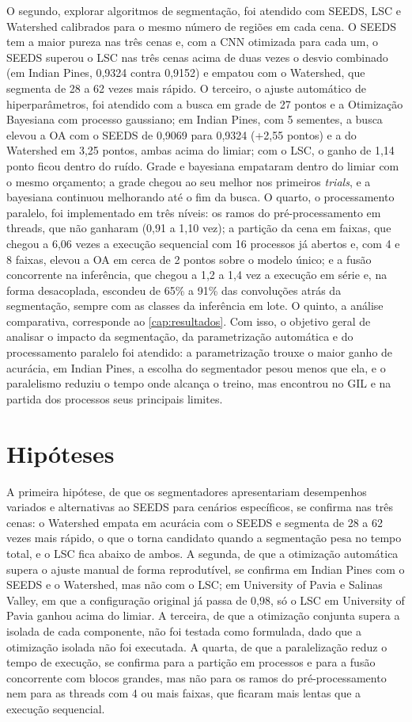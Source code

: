 O segundo, explorar algoritmos de segmentação, foi atendido com SEEDS, LSC e Watershed calibrados para o mesmo número de regiões em cada cena. O SEEDS tem a maior pureza nas três cenas e, com a CNN otimizada para cada um, o SEEDS superou o LSC nas três cenas acima de duas vezes o desvio combinado (em Indian Pines, 0,9324 contra 0,9152) e empatou com o Watershed, que segmenta de 28 a 62 vezes mais rápido. O terceiro, o ajuste automático de hiperparâmetros, foi atendido com a busca em grade de 27 pontos e a Otimização Bayesiana com processo gaussiano; em Indian Pines, com 5 sementes, a busca elevou a OA com o SEEDS de 0,9069 para 0,9324 (+2,55 pontos) e a do Watershed em 3,25 pontos, ambas acima do limiar; com o LSC, o ganho de 1,14 ponto ficou dentro do ruído. Grade e bayesiana empataram dentro do limiar com o mesmo orçamento; a grade chegou ao seu melhor nos primeiros \textit{trials}, e a bayesiana continuou melhorando até o fim da busca. O quarto, o processamento paralelo, foi implementado em três níveis: os ramos do pré-processamento em threads, que não ganharam (0,91 a 1,10 vez); a partição da cena em faixas, que chegou a 6,06 vezes a execução sequencial com 16 processos já abertos e, com 4 e 8 faixas, elevou a OA em cerca de 2 pontos sobre o modelo único; e a fusão concorrente na inferência, que chegou a 1,2 a 1,4 vez a execução em série e, na forma desacoplada, escondeu de 65\% a 91\% das convoluções atrás da segmentação, sempre com as classes da inferência em lote. O quinto, a análise comparativa, corresponde ao \autoref{cap:resultados}. Com isso, o objetivo geral de analisar o impacto da segmentação, da parametrização automática e do processamento paralelo foi atendido: a parametrização trouxe o maior ganho de acurácia, em Indian Pines, a escolha do segmentador pesou menos que ela, e o paralelismo reduziu o tempo onde alcança o treino, mas encontrou no GIL e na partida dos processos seus principais limites.

\section{Hipóteses}

A primeira hipótese, de que os segmentadores apresentariam desempenhos variados e alternativas ao SEEDS para cenários específicos, se confirma nas três cenas: o Watershed empata em acurácia com o SEEDS e segmenta de 28 a 62 vezes mais rápido, o que o torna candidato quando a segmentação pesa no tempo total, e o LSC fica abaixo de ambos. A segunda, de que a otimização automática supera o ajuste manual de forma reprodutível, se confirma em Indian Pines com o SEEDS e o Watershed, mas não com o LSC; em University of Pavia e Salinas Valley, em que a configuração original já passa de 0,98, só o LSC em University of Pavia ganhou acima do limiar. A terceira, de que a otimização conjunta supera a isolada de cada componente, não foi testada como formulada, dado que a otimização isolada não foi executada. A quarta, de que a paralelização reduz o tempo de execução, se confirma para a partição em processos e para a fusão concorrente com blocos grandes, mas não para os ramos do pré-processamento nem para as threads com 4 ou mais faixas, que ficaram mais lentas que a execução sequencial.

